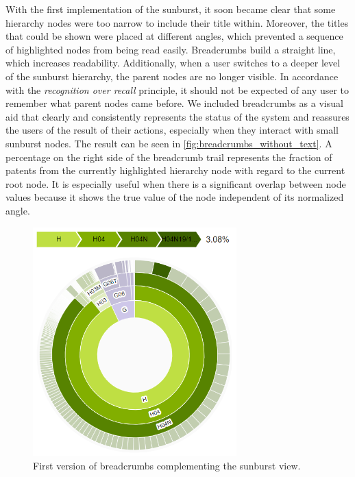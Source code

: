 With the first implementation of the sunburst, it soon became clear that some hierarchy nodes were too narrow to include their title within.
Moreover, the titles that could be shown were placed at different angles, which prevented a sequence of highlighted nodes from being read easily.
Breadcrumbs build a straight line, which increases readability.
Additionally, when a user switches to a deeper level of the sunburst hierarchy, the parent nodes are no longer visible. 
In accordance with the \textit{recognition over recall} principle, it should not be expected of any user to remember what parent nodes came before.
We included breadcrumbs as a visual aid that clearly and consistently represents the status of the system and reassures the users of the result of their actions, especially when they interact with small sunburst nodes.
The result can be seen in \autoref{fig:breadcrumbs_without_text}.
A percentage on the right side of the breadcrumb trail represents the fraction of patents from the currently highlighted hierarchy node with regard to the current root node.
It is especially useful when there is a significant overlap between node values because it shows the true value of the node independent of its normalized angle.

\begin{figure}[!]
\centering
\includegraphics[width=0.7\textwidth]{img/breadcrumbs_without_text}
\caption{First version of breadcrumbs complementing the sunburst view.}
\label{fig:breadcrumbs_without_text}
\end{figure}

